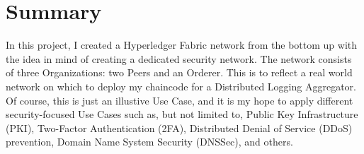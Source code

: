 \section{Summary}
	\hspace{10mm}In this project, I created a Hyperledger Fabric network from the bottom up with the idea in mind of creating a dedicated security network. The network consists of three Organizations: two Peers and an Orderer. This is to reflect a real world network on which to deploy my chaincode for a Distributed Logging Aggregator. Of course, this is just an illustive Use Case, and it is my hope to apply different security-focused Use Cases such as, but not limited to, Public Key Infrastructure (PKI), Two-Factor Authentication (2FA), Distributed Denial of Service (DDoS) prevention, Domain Name System Security (DNSSec), and others.
